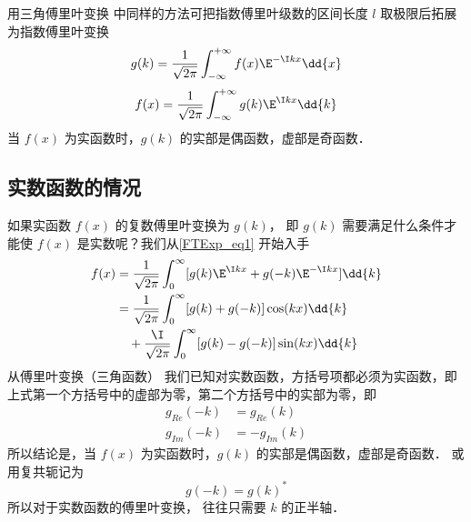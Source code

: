 
\begin{issues}
\issueAbstract
\issueTODO
\end{issues}


用三角傅里叶变换 中同样的方法可把指数傅里叶级数的区间长度 $l$ 取极限后拓展为指数傅里叶变换
\begin{equation}\label{FTExp_eq6}
g(k) = \frac{1}{\sqrt{2\pi }} \int_{-\infty }^{+\infty } f(x)\E^{-\I kx} \dd{x}
\end{equation}
\begin{equation}\label{FTExp_eq1}
f(x) = \frac{1}{\sqrt{2\pi }} \int_{-\infty }^{+\infty } g(k)\E^{\I kx} \dd{k}
\end{equation}
当 $f(x)$ 为实函数时，$g(k)$ 的实部是偶函数，虚部是奇函数．

\subsection{实数函数的情况}

如果实函数 $f(x)$ 的复数傅里叶变换为 $g(k)$， 即 $g(k)$ 需要满足什么条件才能使 $f(x)$ 是实数呢？我们从\autoref{FTExp_eq1} 开始入手
\begin{equation}\begin{aligned}
f(x) &= \frac{1}{\sqrt{2\pi }} \int_0^\infty [g(k)\E^{\I kx} + g(-k)\E^{-\I kx}] \dd{k} \\
&= \frac{1}{\sqrt{2\pi }} \int_0^\infty [g(k)+g(-k)]\cos(kx)\dd{k}\\
&\quad + \frac{\I}{\sqrt{2\pi }} \int_0^\infty [g(k)-g(-k)]\sin(kx) \dd{k}
\end{aligned}\end{equation}
从傅里叶变换（三角函数）%
我们已知对实数函数，方括号项都必须为实函数，即上式第一个方括号中的虚部为零，第二个方括号中的实部为零，即
\begin{equation}\begin{aligned}
g_{Re}(-k) &= g_{Re}(k)\\
g_{Im}(-k) &= -g_{Im}(k)
\end{aligned}\end{equation}
所以结论是，当 $f(x)$ 为实函数时，$g(k)$ 的实部是偶函数，虚部是奇函数． 或用复共轭记为
\begin{equation}\label{FTExp_eq5}
g(-k) = g(k)^*
\end{equation}
所以对于实数函数的傅里叶变换， 往往只需要 $k$ 的正半轴．


